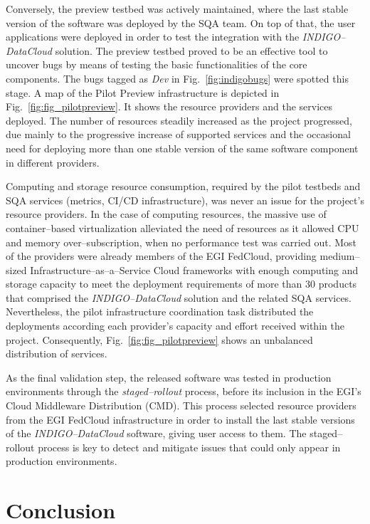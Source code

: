 Conversely, the preview testbed was actively maintained, where the last stable version of
the software was deployed by the SQA team. On top of that, the user applications were 
deployed in order to test the integration with the {\sl INDIGO--DataCloud} solution. The
preview testbed proved to be an effective tool to uncover bugs by means of testing the 
basic functionalities of the core components. The bugs tagged as \emph{Dev} in
Fig.~\ref{fig:indigobugs} were spotted this stage. A map of the Pilot Preview
infrastructure is depicted in Fig.~\ref{fig:fig_pilotpreview}. It shows the
resource providers and the services deployed. The number of resources
steadily increased as the project progressed, due mainly to the progressive increase of 
supported services and the occasional need for deploying more than one stable version of
the same software component in different providers. 

Computing and storage resource consumption, required by the pilot testbeds and SQA services
(metrics, CI/CD infrastructure), was never an issue for the project's resource providers.
In the case of computing resources, the massive use of container--based virtualization 
alleviated the need of resources as it allowed CPU and memory over--subscription, when no
performance test was carried out. Most of the providers were already members of the EGI 
FedCloud, providing medium--sized Infrastructure--as--a--Service Cloud frameworks with 
enough computing and storage capacity to meet the deployment requirements of more than 30 
products that comprised the {\sl INDIGO--DataCloud} solution and the related SQA services.
Nevertheless, the pilot infrastructure coordination task distributed the deployments
according each provider's capacity and effort received within the project. Consequently,
Fig.~\ref{fig:fig_pilotpreview} shows an unbalanced distribution of services.

As the final validation step, the released software was tested in production environments
through the \emph{staged--rollout} process, before its inclusion in the EGI's Cloud 
Middleware Distribution (CMD). This process selected resource providers from the EGI FedCloud
infrastructure in order to install the last stable versions of the {\sl INDIGO--DataCloud}
software, giving user access to them. The staged--rollout process is key to detect and 
mitigate issues that could only appear in production environments.

\section{Conclusion}
\label{sec:con}

